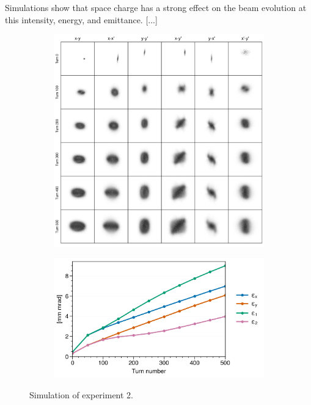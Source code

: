 Simulations show that space charge has a strong effect on the beam evolution at this intensity, energy, and emittance. [...]
%
\begin{figure}[!p]
    \centering
    \begin{subfigure}{0.85\textwidth}
        \includegraphics[width=\textwidth]{Images/chapter5/exp2/sim_snapshots.png}
    \end{subfigure}
    \vfill
    \vspace*{1.0cm}
    \vfill
    \begin{subfigure}{0.7\textwidth}
        \includegraphics[width=\textwidth]{Images/chapter5/exp2/sim_emittances.png}
    \end{subfigure}
    \caption{Simulation of experiment 2.}
    \label{fig:exp2_sim}
\end{figure}
%



